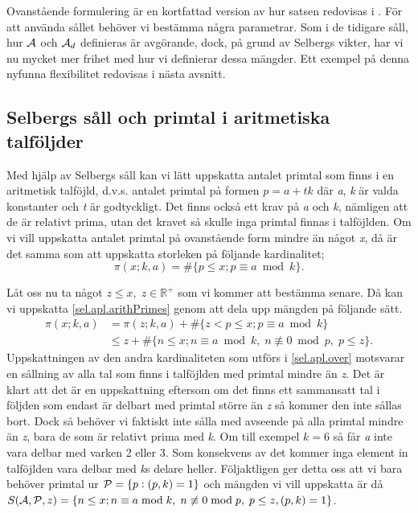 Ovanstående formulering är en kortfattad version av hur satsen redovisas i \cite{cojocarumurty}. För att använda sållet behöver vi bestämma några parametrar. 
Som i de tidigare såll, hur \(\A\) och \(\A_d\) definieras är avgörande, dock, på grund av Selbergs vikter, har vi nu mycket mer frihet med hur vi definierar dessa mängder. 
Ett exempel på denna nyfunna flexibilitet redovisas i nästa avsnitt.

\subsection{Selbergs såll och primtal i aritmetiska talföljder}

Med hjälp av Selbergs såll kan vi lätt uppskatta antalet primtal som finns i en aritmetisk talföjld, d.v.s. antalet primtal på formen \(p = a + tk\) där \textit{a}, \textit{k} är valda konstanter och \textit{t} är godtyckligt. 
Det finns också ett krav på \textit{a} och \textit{k}, nämligen att de är relativt prima, utan det kravet så skulle inga primtal finnas i talföjlden. 
Om vi vill uppskatta antalet primtal på ovanstående form mindre än något \textit{x}, då är det samma som att uppskatta storleken på följande kardinalitet;
\begin{equation}
    \pi(x;k,a) = \#\{p\leq x; p \equiv a \bmod{k}\}.\label{sel.apl.arithPrimes}
\end{equation}

Låt oss nu ta något \(z\leq x,\; z \in \mathbb{R}^+\) som vi kommer att bestämma senare. Då kan vi uppskatta \eqref{sel.apl.arithPrimes} genom att dela upp mängden på följande sätt.
\begin{align}
    \pi(x;k,a) &= \pi(z;k,a) + \#\{z<p\leq x; p \equiv a \bmod{k}\} \nonumber\\
    &\leq z + \#\{n\leq x; n \equiv a \bmod k,\; n \not\equiv 0 \bmod p,\; p\leq z\}.\label{sel.apl.over}
\end{align}
Uppskattningen av den andra kardinaliteten som utförs i \eqref{sel.apl.over} motsvarar en sållning av alla tal som finns i talföjlden med primtal mindre än \textit{z}. 
Det är klart att det är en uppskattning eftersom om det finns ett sammansatt tal i följden som endast är delbart med primtal större än \textit{z} så kommer den inte sållas bort. 
Dock så behöver vi faktiskt inte sålla med avseende på alla primtal mindre än \textit{z}, bara de som är relativt prima med \textit{k}. 
Om till exempel \(k = 6\) så får \textit{a} inte vara delbar med varken 2 eller 3.
Som konsekvens av det kommer inga element in talföjlden vara delbar med \textit{k}s delare heller.
Följaktligen ger detta oss att vi bara behöver primtal ur \(\P = \{p: (p, k) = 1\}\) och mängden vi vill uppskatta är då \(\S{A}{P}{z} = \{n\leq x; n \equiv a \bmod k,\; n \not\equiv 0 \bmod p,\; p\leq z, (p,k) = 1\}\).


